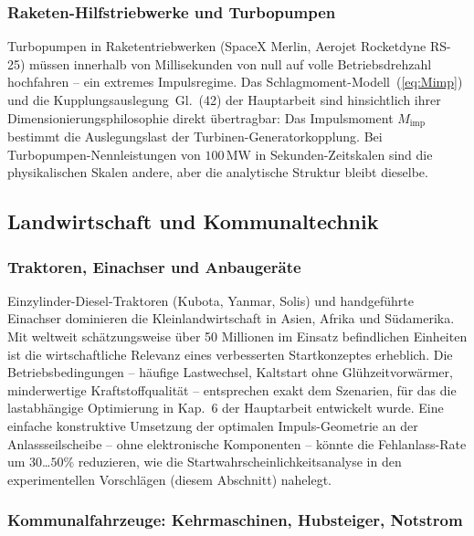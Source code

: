 ﻿\documentclass[a4paper,12pt]{article}
\begin{document}
\subsubsection{Raketen-Hilfstriebwerke und Turbopumpen}

Turbopumpen in Raketentriebwerken (SpaceX Merlin, Aerojet Rocketdyne
RS-25) müssen innerhalb von Millisekunden von null auf
volle Betriebsdrehzahl hochfahren -- ein extremes Impulsregime.
Das Schlagmoment-Modell~(\ref{eq:Mimp}) und die
Kupplungsauslegung~Gl.~(42) der Hauptarbeit sind
hinsichtlich ihrer Dimensionierungsphilosophie direkt
übertragbar: Das Impulsmoment $M_\text{imp}$ bestimmt
die Auslegungslast der Turbinen-Generatorkopplung.
Bei Turbopumpen-Nennleistungen von $100\,\text{MW}$ in
Sekunden-Zeitskalen sind die physikalischen Skalen
andere, aber die analytische Struktur bleibt dieselbe.

\subsection{Landwirtschaft und Kommunaltechnik}

\subsubsection{Traktoren, Einachser und Anbaugeräte}

Einzylinder-Diesel-Traktoren (Kubota, Yanmar, Solis) und
handgeführte Einachser dominieren die Kleinlandwirtschaft
in Asien, Afrika und Südamerika. Mit weltweit schätzungsweise
über 50 Millionen im Einsatz befindlichen Einheiten
ist die wirtschaftliche Relevanz eines verbesserten
Startkonzeptes erheblich. Die Betriebsbedingungen --
häufige Lastwechsel, Kaltstart ohne Glühzeitvorwärmer,
minderwertige Kraftstoffqualität -- entsprechen exakt dem
Szenarien, für das die lastabhängige Optimierung in
Kap.~6 der Hauptarbeit entwickelt wurde. Eine einfache
konstruktive Umsetzung der optimalen Impuls-Geometrie
an der Anlassseilscheibe -- ohne elektronische Komponenten --
könnte die Fehlanlass-Rate um $30$\ldots$50\%$ reduzieren,
wie die Startwahrscheinlichkeitsanalyse in den
experimentellen Vorschlägen (diesem Abschnitt) nahelegt.

\subsubsection{Kommunalfahrzeuge: Kehrmaschinen, Hubsteiger, Notstrom}
\end{document}

